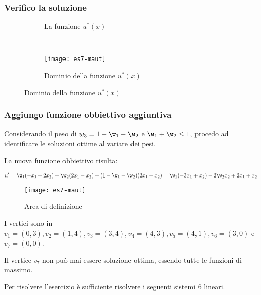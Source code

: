 \documentclass[\main/main.tex]{subfiles}
\begin{document}
\subsubsection*{Verifico la soluzione}

\begin{figure}
  \begin{subfigure}{0.45\textwidth}
    \caption{La funzione $u^*(x)$}
  \end{subfigure}
  ~
  \begin{subfigure}{0.45\textwidth}
    \texttt{[image: es7-maut]}
    \caption{Dominio della funzione $u^*(x)$}
  \end{subfigure}
\end{figure}

\subsubsection*{Aggiungo funzione obbiettivo aggiuntiva}
Considerando il peso di $w_3 = 1- \w_1 - \w_2$ e $\w_1+\w_2\leq1$, procedo ad identificare le soluzioni ottime al variare dei pesi.

La nuova funzione obbiettivo risulta:

\[
  u' = \w_1(-x_1 + 2x_2) + \w_2(2x_1 - x_2) + (1 - \w_1 -\w_2)(2x_1 + x_2) = \w_1(-3x_1 + x_2) - 2\w_2x_2 + 2x_1 + x_2
\]

\begin{figure}
  \texttt{[image: es7-maut]}
  \caption{Area di definizione}
\end{figure}

I vertici sono in $v_1 = (0,3), v_2 = (1,4), v_3 = (3,4), v_4=(4,3), v_5=(4,1), v_6=(3,0)$ e $v_7 = (0,0)$.

Il vertice $v_7$ non può mai essere soluzione ottima, essendo tutte le funzioni di massimo.

Per risolvere l'esercizio è sufficiente risolvere i seguenti sistemi 6 lineari.
\end{document}
